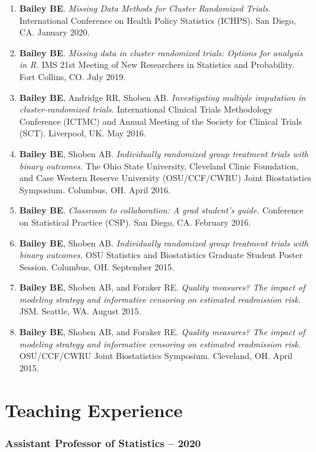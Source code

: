 \documentclass[
  fleqn, oneside]{article}
\begin{document}
\begin{enumerate}
\def\labelenumi{\arabic{enumi}.}
\item
  \textbf{Bailey BE}. \emph{Missing Data Methods for Cluster Randomized
  Trials}. International Conference on Health Policy Statistics (ICHPS).
  San Diego, CA. January 2020.
\item
  \textbf{Bailey BE}. \emph{Missing data in cluster randomized trials:
  Options for analysis in R.} IMS 21st Meeting of New Researchers in
  Statistics and Probability. Fort Collins, CO. July 2019.
\item
  \textbf{Bailey BE}, Andridge RR, Shoben AB. \emph{Investigating
  multiple imputation in cluster-randomized trials.} International
  Clinical Trials Methodology Conference (ICTMC) and Annual Meeting of
  the Society for Clinical Trials (SCT). Liverpool, UK. May 2016.
\item
  \textbf{Bailey BE}, Shoben AB. \emph{Individually randomized group
  treatment trials with binary outcomes.} The Ohio State University,
  Cleveland Clinic Foundation, and Case Western Reserve University
  (OSU/CCF/CWRU) Joint Biostatistics Symposium. Columbus, OH. April
  2016.
\item
  \textbf{Bailey BE}. \emph{Classroom to collaboration: A grad student's
  guide.} Conference on Statistical Practice (CSP). San Diego, CA.
  February 2016.
\item
  \textbf{Bailey BE}, Shoben AB. \emph{Individually randomized group
  treatment trials with binary outcomes.} OSU Statistics and
  Biostatistics Graduate Student Poster Session. Columbus, OH. September
  2015.
\item
  \textbf{Bailey BE}, Shoben AB, and Foraker RE. \emph{Quality measures?
  The impact of modeling strategy and informative censoring on estimated
  readmission risk.} JSM. Seattle, WA. August 2015.
\item
  \textbf{Bailey BE}, Shoben AB, and Foraker RE. \emph{Quality measures?
  The impact of modeling strategy and informative censoring on estimated
  readmission risk.} OSU/CCF/CWRU Joint Biostatistics Symposium.
  Cleveland, OH. April 2015.
\end{enumerate}

\hypertarget{teaching-experience}{%
\section{Teaching Experience}\label{teaching-experience}}

\hypertarget{assistant-professor-of-statistics-2018-2020}{%
\subsubsection{\texorpdfstring{Assistant Professor of Statistics
\hfill{} --
2020}{Assistant Professor of Statistics 2018 -- 2020}}\label{assistant-professor-of-statistics-2018-2020}}
\end{document}
